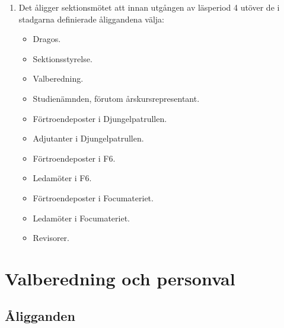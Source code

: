 \documentclass[11pt,a4paper]{article}
\begin{document}
\begin{enumerate}[\thesubsection .1]
  \item Det åligger sektionsmötet att innan utgången av  läsperiod 4
    utöver de i stadgarna definierade åliggandena välja:
    \begin{itemize}
      \item Dragos.
      \item Sektionsstyrelse.
      \item Valberedning.
      \item Studienämnden, förutom årskursrepresentant.
      \item Förtroendeposter i Djungelpatrullen.
      \item Adjutanter i Djungelpatrullen.
      \item Förtroendeposter i F6.
      \item Ledamöter i F6.
      \item Förtroendeposter i Focumateriet.
      \item Ledamöter i Focumateriet. 
       \item Revisorer.
    \end{itemize}

\end{enumerate}

\newpage

\section{Valberedning och personval}

\subsection{Åligganden}
\end{document}
